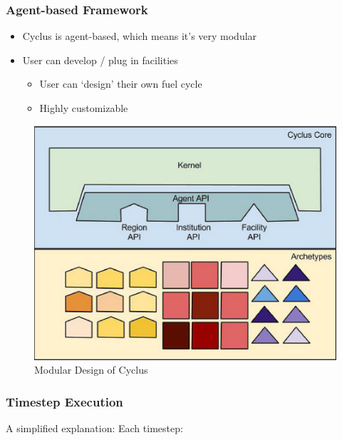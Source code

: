 \begin{frame}
	\frametitle{Agent-based Framework}
	\begin{itemize}
		\item Cyclus is agent-based, which means it's very modular
		\item User can develop / plug in facilities
			\begin{itemize}
				\item User can `design' their own fuel cycle
				\item Highly customizable
			\end{itemize}
	\end{itemize}
	\begin{figure}[htbp!]
        \begin{center}
                \includegraphics[width=.6\textwidth]{./images/cyclus_structure.png}
        \end{center}
        \caption{Modular Design of Cyclus}
        \label{fig:cyclus_struc}

	\end{figure}
\end{frame}

\begin{frame}
    \frametitle{Timestep Execution}
    A simplified explanation: Each timestep:
    
\begin{figure}[H]
\centering
{}
\end{figure}

\end{frame}

